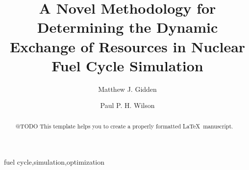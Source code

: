 

\begin{frontmatter}

\title{A Novel Methodology for Determining the Dynamic Exchange of Resources in
  Nuclear Fuel Cycle Simulation}

\author[iiasa]{Matthew J. Gidden}
\address[iiasa]{International Institute for Applied Systems Analysis,
  Schlossplatz 1, A-2361 Laxenburg, Austria}
\author[uw]{Paul P. H. Wilson}
\address[uw]{University of Wisconsin - Madison, Department of Nuclear
  Engineering and Engineering Physics, Madison, WI 53706}

\begin{abstract}
@TODO
This template helps you to create a properly formatted \LaTeX\ manuscript.
\end{abstract}

\begin{keyword}
fuel cycle\sep simulation\sep optimization
\end{keyword}

\end{frontmatter}

\linenumbers

